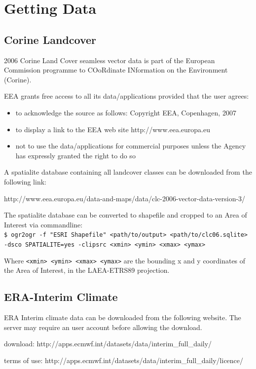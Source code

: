 \documentclass[twoside,a4paper]{refart}
\begin{document}
\section{Getting Data}
\label{data}

\subsection{Corine Landcover}\label{clc}
2006 Corine Land Cover seamless vector data is part of the European Commission programme to COoRdinate INformation on the Environment (Corine). 

EEA grants free access to all its data/applications provided that the user agrees:
\begin{itemize}
\item
to acknowledge the source as follows: Copyright EEA, Copenhagen, 2007

\item
to display a link to the EEA web site http://www.eea.europa.eu

\item
not to use the data/applications for commercial purposes unless the Agency has expressly granted the right to do so 
\end{itemize}
A spatialite database containing all landcover classes can be downloaded from the following link:

http://www.eea.europa.eu/data-and-maps/data/clc-2006-vector-data-version-3/


The spatialite database can be converted to shapefile and cropped to an Area of Interest via commandline:\\
\texttt{\$ ogr2ogr -f "ESRI Shapefile" <path/to/output> <path/to/clc06.sqlite> -dsco SPATIALITE=yes -clipsrc <xmin> <ymin> <xmax> <ymax>}


Where \texttt{<xmin> <ymin> <xmax> <ymax>} are the bounding x and y coordinates of the Area of Interest, in the LAEA-ETRS89 projection.

\subsection{ERA-Interim Climate}\label{era}
ERA Interim climate data can be downloaded from the following website. The server may require an user account before allowing the download.  

download:
http://apps.ecmwf.int/datasets/data/interim\_full\_daily/

terms of use:
http://apps.ecmwf.int/datasets/data/interim\_full\_daily/licence/
\end{document}
